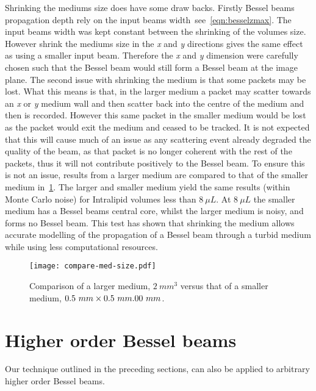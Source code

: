 Shrinking the mediums size does have some draw backs.
Firstly Bessel beams propagation depth rely on the input beams width\ see~\cref{eqn:besselzmax}.
The input beams width was kept constant between the shrinking of the volumes size.
However shrink the mediums size in the \textit{x} and \textit{y} directions gives the same effect as using a smaller input beam.
Therefore the \textit{x} and \textit{y} dimension were carefully chosen such that the Bessel beam would still form a Bessel beam at the image plane.
The second issue with shrinking the medium is that some packets may be lost.
What this means is that, in the larger medium a packet may scatter towards an \textit{x} or \textit{y} medium wall and then scatter back into the centre of the medium and then is recorded.
However this same packet in the smaller medium would be lost as the packet would exit the medium and ceased to be tracked.
It is not expected that this will cause much of an issue as any scattering event already degraded the quality of the beam, as that packet is no longer coherent with the rest of the packets, thus it will not contribute positively to the Bessel beam.
To ensure this is not an issue, results from a larger medium are compared to that of the smaller medium in~\cref{fig:compareBigSmall}.
The larger and smaller medium yield the same results (within Monte Carlo noise) for Intralipid volumes less than $8~\mu L$.
At $8~\mu L$ the smaller medium has a Bessel beams central core, whilst the larger medium is noisy, and forms no Bessel beam.
This test has shown that shrinking the medium allows accurate modelling of the propagation of a Bessel beam through a turbid medium while using less computational resources.

\begin{figure}[!ht]
    \centering
    \texttt{[image: compare-med-size.pdf]}
    \caption{Comparison of a larger medium, $2~mm^3$ versus that of a smaller medium, $0.5~mm \times 0.5~mm \time 2.00~mm$.}
    \label{fig:compareBigSmall}
\end{figure}

\FloatBarrier

\section{Higher order Bessel beams}

Our technique outlined in the preceding sections, can also be applied to arbitrary higher order Bessel beams. 


